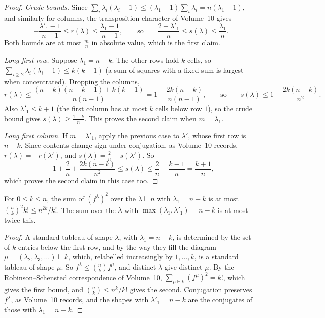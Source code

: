 \begin{proof}
\emph{Crude bounds.} Since $\sum_i\lambda_i(\lambda_i-1)\le(\lambda_1-1)\sum_i\lambda_i=n(\lambda_1-1)$, and similarly for columns, the transposition character of Volume~10 gives
\[
-\frac{\lambda'_1-1}{n-1}\le r(\lambda)\le\frac{\lambda_1-1}{n-1},\qquad\text{so}\qquad\frac{2-\lambda'_1}n\le s(\lambda)\le\frac{\lambda_1}n.
\]
Both bounds are at most $\frac mn$ in absolute value, which is the first claim.

\emph{Long first row.} Suppose $\lambda_1=n-k$. The other rows hold $k$ cells, so $\sum_{i\ge2}\lambda_i(\lambda_i-1)\le k(k-1)$ (a sum of squares with a fixed sum is largest when concentrated). Dropping the columns,
\[
r(\lambda)\le\frac{(n-k)(n-k-1)+k(k-1)}{n(n-1)}=1-\frac{2k(n-k)}{n(n-1)},\qquad\text{so}\qquad s(\lambda)\le1-\frac{2k(n-k)}{n^2}.
\]
Also $\lambda'_1\le k+1$ (the first column has at most $k$ cells below row $1$), so the crude bound gives $s(\lambda)\ge\frac{1-k}n$. This proves the second claim when $m=\lambda_1$.

\emph{Long first column.} If $m=\lambda'_1$, apply the previous case to $\lambda'$, whose first row is $n-k$. Since contents change sign under conjugation, as Volume~10 records, $r(\lambda)=-r(\lambda')$, and $s(\lambda)=\frac2n-s(\lambda')$. So
\[
-1+\frac2n+\frac{2k(n-k)}{n^2}\le s(\lambda)\le\frac2n+\frac{k-1}n=\frac{k+1}n,
\]
which proves the second claim in this case too.
\end{proof}

\begin{lemma}\label{lem:countshapes}
For $0\le k\le n$, the sum of $(f^\lambda)^2$ over the $\lambda\vdash n$ with $\lambda_1=n-k$ is at most $\binom nk^2k!\le n^{2k}/k!$. The sum over the $\lambda$ with $\max(\lambda_1,\lambda'_1)=n-k$ is at most twice this.
\end{lemma}

\begin{proof}
A standard tableau of shape $\lambda$, with $\lambda_1=n-k$, is determined by the set of $k$ entries below the first row, and by the way they fill the diagram $\mu=(\lambda_2,\lambda_3,\dots)\vdash k$, which, relabelled increasingly by $1,\dots,k$, is a standard tableau of shape $\mu$.
So $f^\lambda\le\binom nkf^\mu$, and distinct $\lambda$ give distinct $\mu$. By the Robinson--Schensted correspondence of Volume~10, $\sum_{\mu\vdash k}(f^\mu)^2=k!$, which gives the first bound, and $\binom nk\le n^k/k!$ gives the second. Conjugation preserves $f^\lambda$, as Volume~10 records, and the shapes with
$\lambda'_1=n-k$ are the conjugates of those with $\lambda_1=n-k$.
\end{proof}

